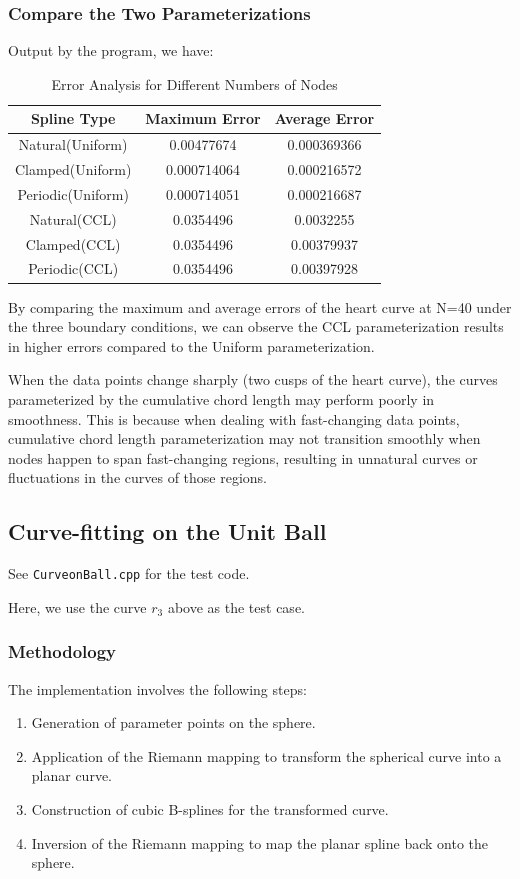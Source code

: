 \documentclass{article}
\begin{document}
\subsubsection{Compare the Two Parameterizations}
Output by the program, we have:
\begin{table}[H]
\centering
\begin{tabular}{|c|c|c|}
\hline
Spline Type & Maximum Error & Average Error \\ \hline
Natural(Uniform) & 0.00477674 & 0.000369366 \\ 
Clamped(Uniform) & 0.000714064 & 0.000216572  \\ 
Periodic(Uniform) & 0.000714051 & 0.000216687  \\ \hline
Natural(CCL) & 0.0354496 & 0.0032255  \\ 
Clamped(CCL) & 0.0354496 & 0.00379937  \\ 
Periodic(CCL) & 0.0354496 & 0.00397928  \\ \hline
\end{tabular}
\caption{Error Analysis for Different Numbers of Nodes}
\label{tab:error_analysis}
\end{table}
By comparing the maximum and average errors of the heart curve at N=40 under the three boundary conditions, we can observe the CCL parameterization results in higher errors compared to the Uniform parameterization.\par
When the data points change sharply (two cusps of the heart curve), the curves parameterized by the cumulative chord length may perform poorly in smoothness. This is because when dealing with fast-changing data points, cumulative chord length parameterization may not transition smoothly when nodes happen to span fast-changing regions, resulting in unnatural curves or fluctuations in the curves of those regions.


\subsection{Curve-fitting on the Unit Ball}
See \texttt{CurveonBall.cpp} for the test code.\par
Here, we use the curve \(r_3\) above as the test case.
\subsubsection{Methodology}
The implementation involves the following steps:
\begin{enumerate}
    \item Generation of parameter points on the sphere.
    \item Application of the Riemann mapping to transform the spherical curve into a planar curve.
    \item Construction of cubic B-splines for the transformed curve.
    \item Inversion of the Riemann mapping to map the planar spline back onto the sphere.
\end{enumerate}
\end{document}
